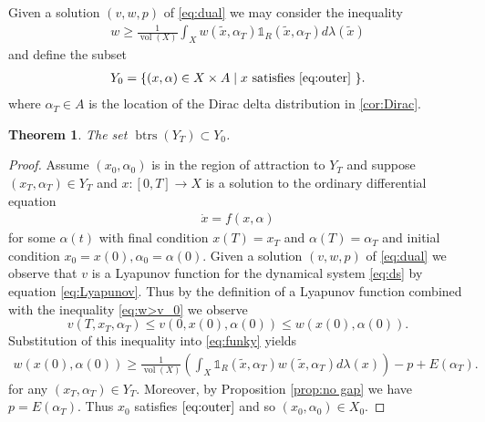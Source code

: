 \documentclass[12pt]{amsart}
\DeclareMathOperator{\vol}{vol}
\DeclareMathOperator{\btrs}{btrs}
\newtheorem{thm}{Theorem}[section]
\begin{document}
Given a solution $(v,w,p)$ of \eqref{eq:dual} we may consider the inequality
\begin{align}
	w \geq \frac{1}{\vol(X)} \int_{X} w(\tilde{x},\alpha_T) \mathds{1}_{R}(\tilde{x},\alpha_T) d\lambda(\tilde{x}) \label{eq:outer}
\end{align}
and define the subset
\begin{align}
	Y_0 = \{ (x,\alpha) \in X \times A \mid  \text{$x$ satisfies \eqref{eq:outer} } \}. \label{eq:X_0}
\end{align}
where $\alpha_T \in A$ is the location of the Dirac delta distribution in \eqref{cor:Dirac}.

\begin{thm} \label{thm:outer}
  The set  $\btrs ( Y_T )  \subset Y_0$.
\end{thm}
\begin{proof}
Assume $(x_0,\alpha_0)$ is in the region of attraction to $Y_T$
and suppose $(x_T,\alpha_T) \in Y_T$ and $x: [0,T] \to X$ is a solution to the ordinary differential equation
\begin{align}
	\dot{x} = f(x,\alpha) \label{eq:ds}
\end{align}
for some $\alpha(t)$ with final condition $x(T) = x_T$ and $\alpha(T) = \alpha_T$ and initial condition $x_0 = x(0), \alpha_0 = \alpha(0)$.
Given a solution $(v,w,p)$ of \eqref{eq:dual} we observe that $v$ is a Lyapunov function for the dynamical system \eqref{eq:ds}
by equation \eqref{eq:Lyapunov}.
Thus by the definition of a Lyapunov function combined with the inequality \eqref{eq:w>v_0} we observe
\begin{equation*}
v(T,x_T,\alpha_T) \leq v(0,x(0),\alpha(0))  \leq w(x(0),\alpha(0)).
\end{equation*}
Substitution of this inequality into \eqref{eq:funky} yields
\begin{align*}
w(x(0),\alpha(0)) \geq \frac{1}{ \vol(X) } \left( \int_X \mathds{1}_R(\tilde{x},\alpha_T) w(\tilde{x},\alpha_T) d \lambda(x) \right)
		- p +E(\alpha_T).
\end{align*}
for any $(x_T,\alpha_T) \in Y_T$.
Moreover, by Proposition \ref{prop:no gap} we have $p = E(\alpha_T)$.
Thus $x_0$ satisfies $\eqref{eq:outer}$ and so $(x_0,\alpha_0) \in X_0$.
\end{proof}
\end{document}
